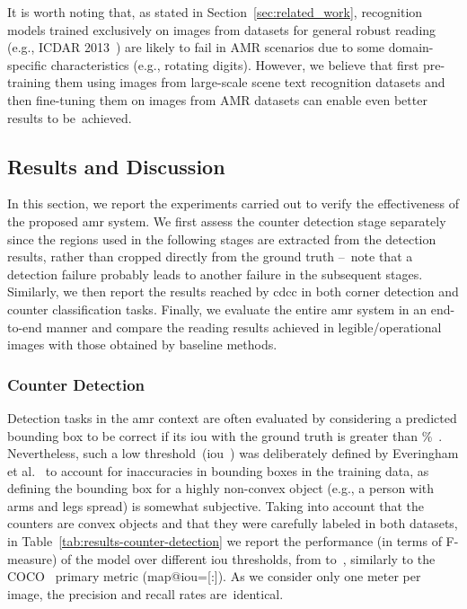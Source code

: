 It is worth noting that, as stated in Section~\ref{sec:related_work}, recognition models trained exclusively on images from datasets for general robust reading (e.g., ICDAR 2013~\cite{karatzas2013icdar}) are likely to fail in AMR scenarios due to some domain-specific characteristics (e.g., rotating digits).
However, we believe that first pre-training them using images from large-scale scene text recognition datasets and then fine-tuning them on images from AMR datasets can enable  even better results to be~achieved.

\subsection{Results and Discussion}

In this section, we report the experiments carried out to verify the effectiveness of the proposed \gls*{amr} system.
We first assess the counter detection stage separately since the regions used in the following stages are extracted from the detection results, rather than cropped directly from the ground truth --~note that a detection failure probably leads to another failure in the subsequent stages.
Similarly, we then report the results reached by \gls*{cdcc} in both corner detection and counter classification tasks.
Finally, we evaluate the entire \gls*{amr} system in an end-to-end manner  and compare the reading results achieved in legible/operational images with those obtained by \numbaselines baseline methods.





\subsubsection{Counter Detection}
\label{sec:results:cd}

Detection tasks in the \gls*{amr} context are often evaluated by considering a predicted bounding box to be correct if its \gls*{iou} with the ground truth is greater than \%~\cite{laroca2019convolutional,salomon2020deep}.
Nevertheless, such a low threshold~(\gls*{iou}~) was deliberately defined by Everingham et al.~\cite{everingham2010pascalvoc} to account for inaccuracies in bounding boxes in the training data, as defining the bounding box for a highly non-convex object (e.g., a person with arms and legs spread) is somewhat subjective.
Taking into account that the counters are convex objects and that they were carefully labeled in both datasets, in Table~\ref{tab:results-counter-detection} we report the performance (in terms of F-measure) of the \detnet model over different \gls*{iou} thresholds, from  to~, similarly to the COCO~\cite{lin2014microsoft} primary metric (\gls*{map}@\gls*{iou}=[:]).
As we consider only one meter per image, the precision and recall rates are~identical.

